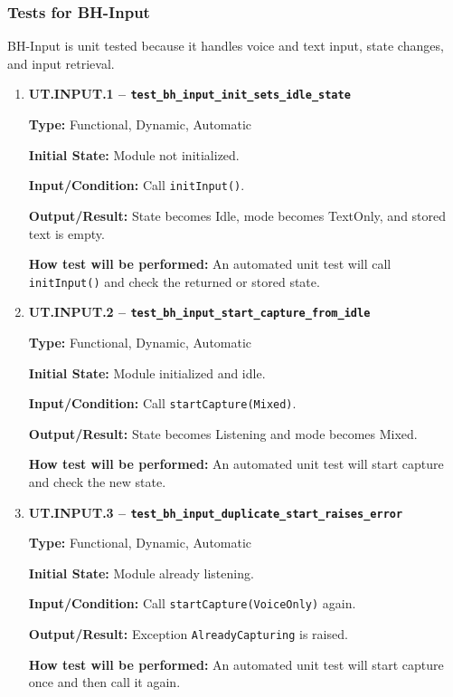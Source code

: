 \documentclass[12pt, titlepage]{article}
\begin{document}
\subsubsection{Tests for BH-Input}

BH-Input is unit tested because it handles voice and text input,
state changes, and input retrieval.

\begin{enumerate}

\item \textbf{UT.INPUT.1 --
\texttt{test\_bh\_input\_init\_sets\_idle\_state}}

\textbf{Type:} Functional, Dynamic, Automatic

\textbf{Initial State:} Module not initialized.

\textbf{Input/Condition:} Call \texttt{initInput()}.

\textbf{Output/Result:} State becomes Idle, mode becomes TextOnly, and stored
text is empty.

\textbf{How test will be performed:} An automated unit test will call
\texttt{initInput()} and check the returned or stored state.

\item \textbf{UT.INPUT.2 --
\texttt{test\_bh\_input\_start\_capture\_from\_idle}}

\textbf{Type:} Functional, Dynamic, Automatic

\textbf{Initial State:} Module initialized and idle.

\textbf{Input/Condition:} Call \texttt{startCapture(Mixed)}.

\textbf{Output/Result:} State becomes Listening and mode becomes Mixed.

\textbf{How test will be performed:} An automated unit test will start capture
and check the new state.

\item \textbf{UT.INPUT.3 --
\texttt{test\_bh\_input\_duplicate\_start\_raises\_error}}

\textbf{Type:} Functional, Dynamic, Automatic

\textbf{Initial State:} Module already listening.

\textbf{Input/Condition:} Call \texttt{startCapture(VoiceOnly)} again.

\textbf{Output/Result:} Exception \texttt{AlreadyCapturing} is raised.

\textbf{How test will be performed:} An automated unit test will start capture
once and then call it again.


\end{enumerate}
\end{document}
